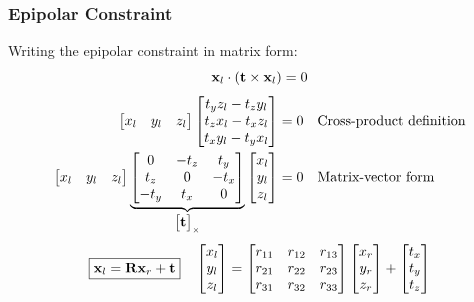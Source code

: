 \begin{frame}
    \frametitle{Epipolar Constraint}
    Writing the epipolar constraint in matrix form:
%
    \begin{equation*}
        \mathbf{x}_l \cdot (\boldsymbol{\mathbf{t}} \times \mathbf{x}_l) = 0
    \end{equation*}
%
    \begin{align*}
        \begin{bmatrix} x_l & y_l & z_l \end{bmatrix}
        \begin{bmatrix}
            t_y z_l - t_z y_l \\
            t_z x_l - t_x z_l \\
            t_x y_l - t_y x_l
        \end{bmatrix} &= 0 \quad \text{Cross-product definition}\\
        \begin{bmatrix} x_l & y_l & z_l \end{bmatrix}
        \underbrace{\begin{bmatrix}
            0 & -t_z & t_y \\
            t_z & 0 & -t_x \\
            -t_y & t_x & 0
        \end{bmatrix}}_{\begin{bmatrix}\boldsymbol{\mathbf{t}}\end{bmatrix}_{\times}}
        \begin{bmatrix} x_l \\ y_l \\ z_l \end{bmatrix} &= 0
        \quad \text{Matrix-vector form}
    \end{align*}
%
    \begin{equation*}
        \boxed{
        \mathbf{x}_l = \boldsymbol{\mathbf{R}} \mathbf{x}_r + \boldsymbol{\mathbf{t}}
        }
        \quad
        \begin{bmatrix} x_l \\ y_l \\ z_l \end{bmatrix} =
        \begin{bmatrix}
            r_{11} & r_{12} & r_{13} \\
            r_{21} & r_{22} & r_{23} \\
            r_{31} & r_{32} & r_{33}
        \end{bmatrix}
        \begin{bmatrix} x_r \\ y_r \\ z_r \end{bmatrix} +
        \begin{bmatrix} t_x \\ t_y \\ t_z \end{bmatrix}
    \end{equation*}
\end{frame}

